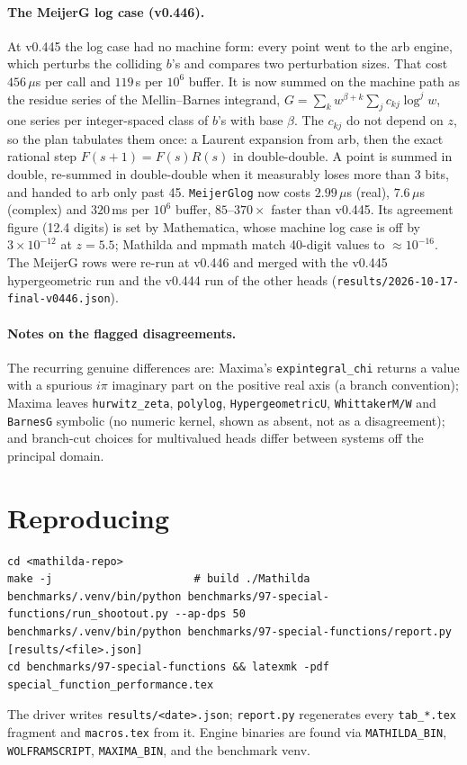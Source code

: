 \documentclass[11pt]{article}
\newcommand{\mcode}[1]{\texttt{\textcolor{mCode}{#1}}}
\begin{document}
\paragraph{The MeijerG log case (v0.446).} At v0.445 the log case had no machine form:
every point went to the arb engine, which perturbs the colliding $b$'s and compares two
perturbation sizes. That cost $456\,\mu$s per call and $119$\,s per $10^6$ buffer. It is
now summed on the machine path as the residue series of the Mellin--Barnes integrand,
$G=\sum_k w^{\beta+k}\sum_j c_{kj}\log^j w$, one series per integer-spaced class of $b$'s
with base $\beta$. The $c_{kj}$ do not depend on $z$, so the plan tabulates them once: a
Laurent expansion from arb, then the exact rational step $F(s+1)=F(s)R(s)$ in
double-double. A point is summed in double, re-summed in double-double when it
measurably loses more than 3 bits, and handed to arb only past 45. \mcode{MeijerGlog} now
costs $2.99\,\mu$s (real), $7.6\,\mu$s (complex) and $320$\,ms per $10^6$ buffer,
$85$--$370\times$ faster than v0.445. Its agreement figure (12.4 digits) is set by
Mathematica, whose machine log case is off by $3\times10^{-12}$ at $z=5.5$; Mathilda and
mpmath match 40-digit values to $\approx 10^{-16}$. The MeijerG rows were re-run at v0.446
and merged with the v0.445 hypergeometric run and the v0.444 run of the other heads
(\mcode{results/2026-10-17-final-v0446.json}).

\paragraph{Notes on the flagged disagreements.}
The recurring genuine differences are: Maxima's \mcode{expintegral\_chi} returns a value
with a spurious $i\pi$ imaginary part on the positive real axis (a branch convention);
Maxima leaves \mcode{hurwitz\_zeta}, \mcode{polylog}, \mcode{HypergeometricU},
\mcode{WhittakerM/W} and \mcode{BarnesG} symbolic (no numeric kernel, shown as absent, not
as a disagreement); and branch-cut choices for multivalued heads differ between systems
off the principal domain.

\section{Reproducing}

\begin{verbatim}
cd <mathilda-repo>
make -j                      # build ./Mathilda
benchmarks/.venv/bin/python benchmarks/97-special-functions/run_shootout.py --ap-dps 50
benchmarks/.venv/bin/python benchmarks/97-special-functions/report.py [results/<file>.json]
cd benchmarks/97-special-functions && latexmk -pdf special_function_performance.tex
\end{verbatim}

\noindent
The driver writes \mcode{results/<date>.json}; \mcode{report.py} regenerates every
\mcode{tab\_*.tex} fragment and \mcode{macros.tex} from it. Engine binaries are found via
\mcode{MATHILDA\_BIN}, \mcode{WOLFRAMSCRIPT}, \mcode{MAXIMA\_BIN}, and the benchmark venv.
\end{document}
